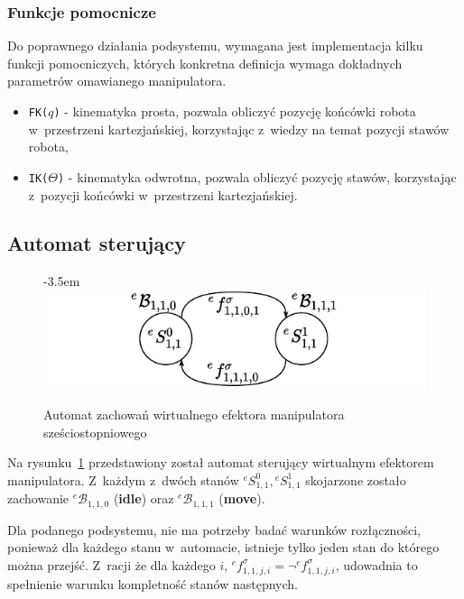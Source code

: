 \subsubsection{Funkcje pomocnicze}
Do poprawnego działania podsystemu, wymagana jest implementacja kilku funkcji pomocniczych, których konkretna definicja wymaga dokładnych parametrów omawianego manipulatora.

\begin{itemize}
    \item \texttt{FK($q$)} - kinematyka prosta, pozwala obliczyć pozycję końcówki robota w~przestrzeni kartezjańskiej, korzystając z~wiedzy na temat pozycji stawów robota,
    \item \texttt{IK($\Theta$)} - kinematyka odwrotna, pozwala obliczyć pozycję stawów, korzystając z~pozycji końcówki w~przestrzeni kartezjańskiej.
\end{itemize}

\subsection{Automat sterujący}
\begin{figure}[ht]
    \leftskip-3.5em
    \includegraphics[width=1.3\columnwidth]{figures/ISR-ve-manip-behaviours.pdf}
    \caption{Automat zachowań wirtualnego efektora manipulatora sześciostopniowego}
    \label{fig:zachowania-ve-manip}
\end{figure}

Na rysunku~\ref{fig:zachowania-ve-manip} przedstawiony został automat sterujący wirtualnym efektorem manipulatora. Z~każdym z~dwóch stanów $ {}^{e}S_{1,1}^0,  {}^{e}S_{1,1}^1$ skojarzone zostało zachowanie ${}^{e}\mathcal{B}_{1,1,0}$ (\textbf{idle}) oraz ${}^{e}\mathcal{B}_{1,1,1}$ (\textbf{move}). 

Dla podanego podsystemu, nie ma potrzeby badać warunków rozłączności, ponieważ dla każdego stanu w~automacie, istnieje tylko jeden stan do którego można przejść. Z~racji że dla każdego $i$, ${}^{e}f^{\sigma}_{1,1,j,i} = \neg {}^{e}f^{\sigma}_{1,1,j,i}$, udowadnia to spełnienie warunku kompletność stanów następnych.

